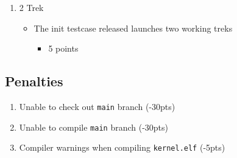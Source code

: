 \documentclass{article}
\begin{document}
\begin{enumerate}
\begin {itemize}
            \begin {itemize}
                \item 5 points
            \end{itemize}
        \end{itemize}
    \item 2 Trek
        \begin {itemize}
            \item The init testcase released launches two working treks
            \begin {itemize}
                \item 5 points
            \end{itemize}
        \end{itemize}
\end{enumerate}
\subsection*{Penalties}
\begin{enumerate}
    \item Unable to check out \texttt{main} branch (-30pts)
    \item Unable to compile \texttt{main} branch (-30pts)
    \item Compiler warnings when compiling \texttt{kernel.elf} (-5pts)
\end{enumerate}




\end{document}
